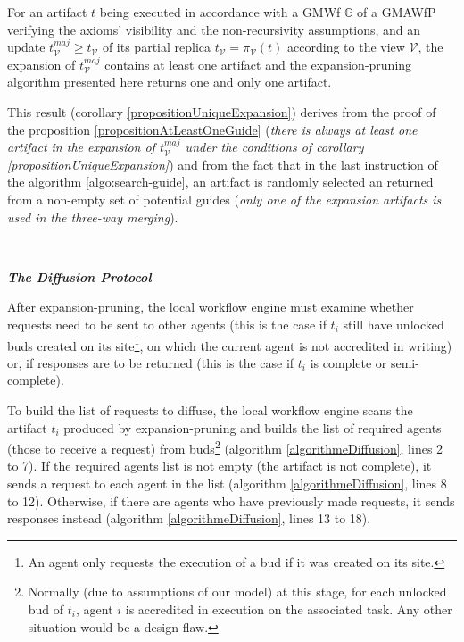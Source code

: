 {\begin{corollary}
	\label{propositionUniqueExpansion}
	For an artifact $t$ being executed in accordance with a GMWf $\mathbb{G}$ of a GMAWfP verifying the axioms' visibility and the non-recursivity assumptions, and an update $t_{\mathcal{V}}^{maj} \geq t_{\mathcal{V}}$ of its partial replica $t_{\mathcal{V}}=\pi_{\mathcal{V}}\left(t\right)$ according to the view $\mathcal{V}$, the expansion of $t_{\mathcal{V}}^{maj}$ contains at least one artifact and the expansion-pruning algorithm presented here returns one and only one artifact.
\end{corollary}

\begin{comment}
\begin{proof}
	The proof of this corollary derives from the proof of the proposition \ref{propositionAtLeastOneGuide} and from the fact that in the last instruction of the algorithm \ref{chap3:algo:search-guide}, an artifact is randomly selected an returned from a non-empty set of potential guides.
\end{proof}
\end{comment}
This result (corollary \ref{propositionUniqueExpansion}) derives from the proof of the proposition \ref{propositionAtLeastOneGuide} (\textit{there is always at least one artifact in the expansion of $t_{\mathcal{V}}^{maj}$ under the conditions of corollary \ref{propositionUniqueExpansion}}) and from the fact that in the last instruction of the algorithm \ref{algo:search-guide}, an artifact is randomly selected an returned from a non-empty set of potential guides (\textit{only one of the expansion artifacts is used in the three-way merging}).

~

\noindent\textbf{\textit{The Diffusion Protocol}}
\label{chap3:sec:execution-protocol-diffusion}

After expansion-pruning, the local workflow engine must examine whether requests need to be sent to other agents (this is the case if $t_i$ still have unlocked buds created on its site\footnote{An agent only requests the execution of a bud if it was created on its site.}, on which the current agent is not accredited in writing) or, if responses are to be returned (this is the case if $t_i$ is complete or semi-complete).

To build the list of requests to diffuse, the local workflow engine scans the artifact $t_i$ produced by expansion-pruning and builds the list of required agents (those to receive a request) from buds\footnote{Normally (due to assumptions of our model) at this stage, for each unlocked bud of $t_i$, agent $i$ is accredited in execution on the associated task. Any other situation would be a design flaw.} (algorithm \ref{algorithmeDiffusion}, lines 2 to 7). If the required agents list is not empty (the artifact is not complete), it sends a request to each agent in the list (algorithm \ref{algorithmeDiffusion}, lines 8 to 12). Otherwise, if there are agents who have previously made requests, it sends responses instead (algorithm \ref{algorithmeDiffusion}, lines 13 to 18).

}
